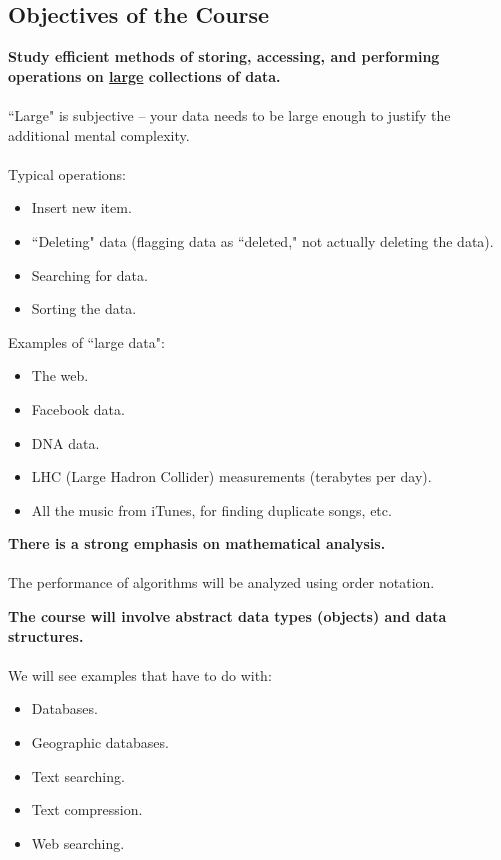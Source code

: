 \documentclass[]{article}
\theoremstyle{definition}
\begin{document}
		\subsection{Objectives of the Course}
			\begin{itemize}
				\begin{item}
					\textbf{Study efficient methods of storing, accessing, and performing operations on \underline{large} collections of data.} \\ \\
					``Large" is subjective -- your data needs to be large enough to justify the additional mental complexity. \\ \\
					Typical operations:
					\begin{itemize}
						\item Insert new item.
						\item ``Deleting" data (flagging data as ``deleted," not actually deleting the data).
						\item Searching for data.
						\item Sorting the data. \\
					\end{itemize}
				
					Examples of ``large data":
					\begin{itemize}
						\item The web.
						\item Facebook data.
						\item DNA data.
						\item LHC (Large Hadron Collider) measurements (terabytes per day).
						\item All the music from iTunes, for finding duplicate songs, etc.
					\end{itemize}
				\end{item}
				
				\begin{item}
					\textbf{There is a strong emphasis on mathematical analysis.} \\ \\
					The performance of algorithms will be analyzed using order notation.
				\end{item}
				
				\begin{item}
					\textbf{The course will involve abstract data types (objects) and data structures.} \\ \\
					We will see examples that have to do with:
					\begin{itemize}
						\item Databases.
						\item Geographic databases.
						\item Text searching.
						\item Text compression.
						\item Web searching.
					\end{itemize}
				\end{item}
			\end{itemize}
			
\end{document}
